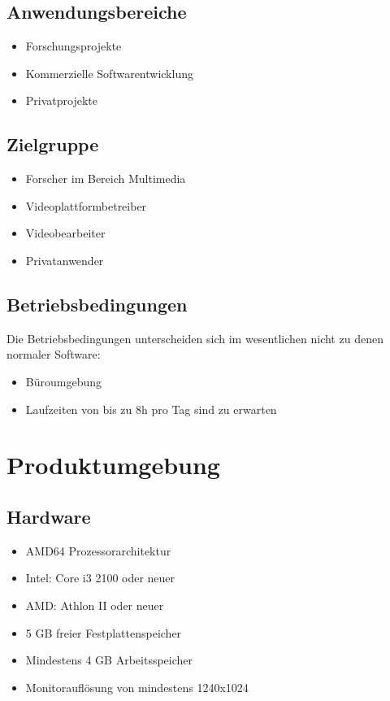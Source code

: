 \documentclass[parskip=full]{scrartcl}
\begin{document}
\subsection{Anwendungsbereiche}
\begin{itemize}
\item Forschungsprojekte
\item Kommerzielle Softwarentwicklung
\item Privatprojekte
\end{itemize}
\subsection{Zielgruppe}
\begin{itemize}
\item Forscher im Bereich Multimedia
\item Videoplattformbetreiber
\item Videobearbeiter
\item Privatanwender
\end{itemize}
\subsection{Betriebsbedingungen}
Die Betriebsbedingungen unterscheiden sich im wesentlichen nicht zu denen normaler 
\linebreak
Software:
\begin{itemize}
\item Büroumgebung
\item Laufzeiten von bis zu 8h pro Tag sind zu erwarten
\end{itemize}
\newpage
\section{Produktumgebung}

\subsection{Hardware}
\begin{itemize}
\item AMD64 Prozessorarchitektur
\item Intel: Core i3 2100 oder neuer
\item AMD: Athlon II oder neuer
\item 5 GB freier Festplattenspeicher
\item Mindestens 4 GB Arbeitsspeicher
\item Monitorauflösung von mindestens 1240x1024
\end{itemize}
\end{document}
